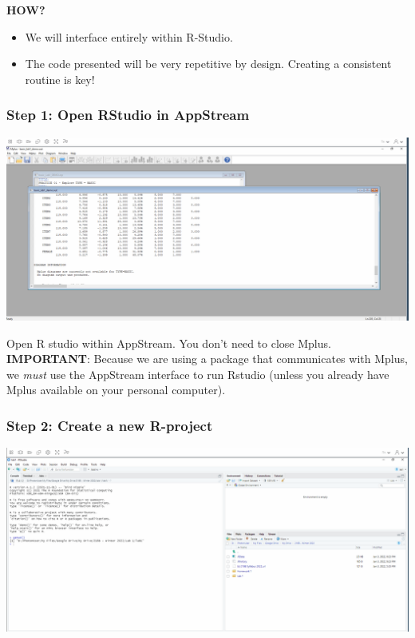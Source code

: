 \documentclass[
]{article}
\providecommand{\tightlist}{%
  \setlength{\itemsep}{0pt}\setlength{\parskip}{0pt}}
\begin{document}
\textbf{HOW?}

\begin{itemize}
\tightlist
\item
  We will interface entirely within R-Studio.
\item
  The code presented will be very repetitive by design. Creating a
  consistent routine is key!
\end{itemize}

\hypertarget{step-1-open-rstudio-in-appstream}{%
\subsubsection{Step 1: Open RStudio in
AppStream}\label{step-1-open-rstudio-in-appstream}}

\includegraphics{rstudio.gif}

Open R studio within AppStream. You don't need to close Mplus.
\textbf{IMPORTANT}: Because we are using a package that communicates
with Mplus, we \emph{must} use the AppStream interface to run Rstudio
(unless you already have Mplus available on your personal computer).

\hypertarget{step-2-create-a-new-r-project}{%
\subsubsection{Step 2: Create a new
R-project}\label{step-2-create-a-new-r-project}}

\includegraphics{rproject.gif}
\end{document}
